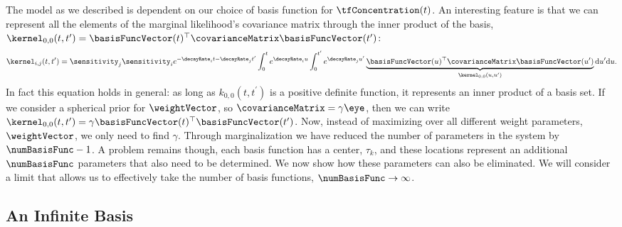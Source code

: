 \documentclass{article}
\begin{document}
The model as we described is dependent on our choice of basis function
for $\tfConcentration(t)$. An interesting feature is that we can
represent all the elements of the marginal likelihood's covariance matrix through
the inner product of the basis, $\kernel_{0,0}(t,
t^\prime)=\basisFuncVector(t)^\top\covarianceMatrix\basisFuncVector(t^\prime)$:
\begin{equation}
  \label{eq:convolution}
\kernel_{i,j}(t,t^\prime) = \sensitivity_j\sensitivity_i e^{-\decayRate_{i}t-\decayRate_{j}t^\prime}\int_0^t
e^{\decayRate_{i}u} \int_0^{t^\prime} e^{\decayRate_{j}u^\prime}\underbrace{\basisFuncVector(u)^\top \covarianceMatrix \basisFuncVector(u^\prime)}_{\kernel_{0,0}(u, u^\prime)}\mathrm{d}u^\prime \mathrm{d}u.
\end{equation}
In fact this equation holds in general: as long as $k_{0,0}(t,
t^\prime)$ is a positive definite function, it represents an inner
product of a basis set. If we consider a spherical prior for
$\weightVector$, so $\covarianceMatrix=\gamma\eye$, then we can write
$\kernel_{0,0}(t,t^\prime) = \gamma
\basisFuncVector(t)^\top\basisFuncVector(t^\prime)$. Now, instead of maximizing
over all different weight parameters, $\weightVector$, we only need to
find $\gamma$. Through marginalization we have reduced the number of
parameters in the system by $\numBasisFunc-1$. A problem remains
though, each basis function has a center, $\tau_k$, and these
locations represent an additional $\numBasisFunc$ parameters that also
need to be determined. We now show how these parameters can also be
eliminated. We will consider a limit that allows us to
effectively take the number of basis functions, $\numBasisFunc\rightarrow\infty$.

\subsection{An Infinite Basis}
\end{document}

